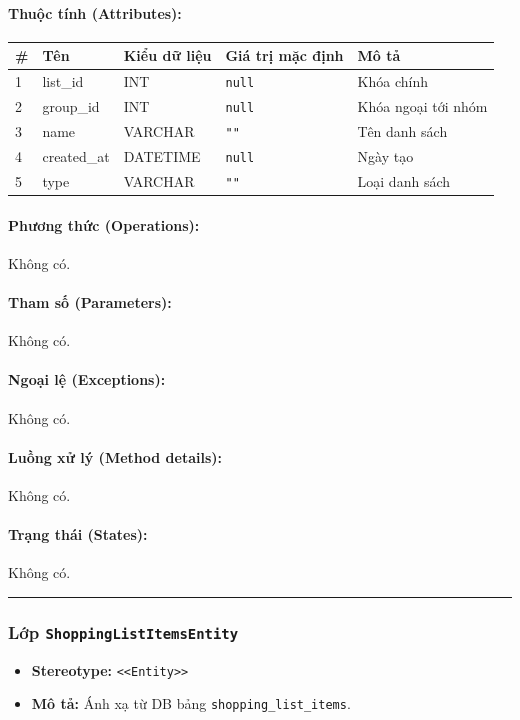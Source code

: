 \documentclass[12pt,a4paper]{article}
\begin{document}
\paragraph{Thuộc tính (Attributes):}
\begin{longtable}{|p{0.6cm}|p{2.8cm}|p{2.2cm}|p{1.8cm}|p{5.8cm}|}
\hline
\textbf{\#} & \textbf{Tên} & \textbf{Kiểu dữ liệu} & \textbf{Giá trị mặc định} & \textbf{Mô tả} \\ \hline
\endhead
1 & list\_id & INT & \texttt{null} & Khóa chính \\ \hline
2 & group\_id & INT & \texttt{null} & Khóa ngoại tới nhóm \\ \hline
3 & name & VARCHAR & \texttt{""} & Tên danh sách \\ \hline
4 & created\_at & DATETIME & \texttt{null} & Ngày tạo \\ \hline
5 & type & VARCHAR & \texttt{""} & Loại danh sách \\ \hline
\end{longtable}

\paragraph{Phương thức (Operations):}
Không có.

\paragraph{Tham số (Parameters):}
Không có.

\paragraph{Ngoại lệ (Exceptions):}
Không có.

\paragraph{Luồng xử lý (Method details):}
Không có.

\paragraph{Trạng thái (States):}
Không có.

\vskip 0.5cm
\noindent\rule{\textwidth}{0.5pt}
\vskip 0.5cm

\subsubsection{Lớp \texttt{ShoppingListItemsEntity}}
\begin{itemize}[leftmargin=*]
    \item \textbf{Stereotype:} \texttt{\textless{}\textless{}Entity\textgreater{}\textgreater{}}
    \item \textbf{Mô tả:} Ánh xạ từ DB bảng \texttt{shopping\_list\_items}.
\end{itemize}
\end{document}
